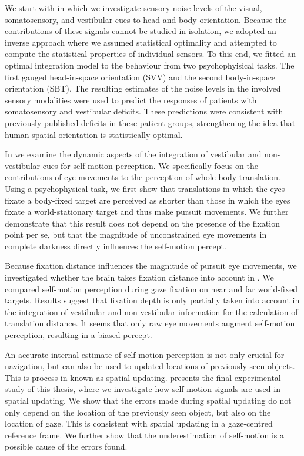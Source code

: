 We start with  in which we investigate sensory noise levels of the visual, somatosensory, and vestibular cues to head and body orientation. Because the contributions of these signals cannot be studied in isolation, we adopted an inverse approach where we assumed statistical optimality and attempted to compute the statistical properties of individual sensors. To this end, we fitted an optimal integration model to the behaviour from two psychophyisical tasks. The first gauged head-in-space orientation (SVV) and the second body-in-space orientation (SBT). The resulting estimates of the noise levels in the involved sensory modalities were used to predict the responses of patients with somatosensory and vestibular deficits. These predictions were consistent with previously published deficits in these patient groups, strengthening the idea that human spatial orientation is statistically optimal.

In  we examine the dynamic aspects of the integration of vestibular and non-vestibular cues for self-motion perception. We specifically focus on the contributions of eye movements to the perception of whole-body translation. Using a psychophysical task, we first show that translations in which the eyes fixate a body-fixed target are perceived as shorter than those in which the eyes fixate a world-stationary target and thus make pursuit movements. We further demonstrate that this result does not depend on the presence of the fixation point per se, but that the magnitude of unconstrained eye movements in complete darkness directly influences the self-motion percept. 

Because fixation distance influences the magnitude of pursuit eye movements, we investigated  whether the brain takes fixation distance into account in . We compared self-motion perception during gaze fixation on near and far world-fixed targets. Results suggest that fixation depth is only partially taken into account in the integration of vestibular and non-vestibular information for the calculation of translation distance. It seems that only raw eye movements augment self-motion perception, resulting in a biased percept.

An accurate internal estimate of self-motion perception is not only crucial for navigation, but can also be used to updated locations of previously seen objects. This is process in known as spatial updating.  presents the final experimental study of this thesis, where we investigate how self-motion signals are used in spatial updating. We show that the errors made during spatial updating do not only depend on the location of the previously seen object, but also on the location of gaze. This is consistent with spatial updating in a gaze-centred reference frame. We further show that the underestimation of self-motion is a possible cause of the errors found.

